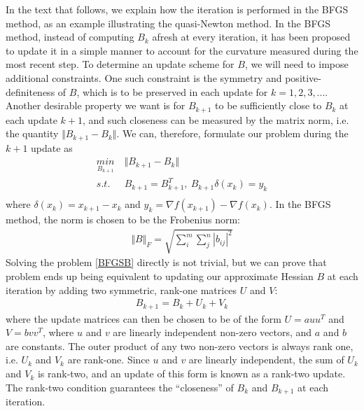 \documentclass  [
  paper    = a4,
  BCOR     = 10mm,
  twoside,
  fontsize = 12pt,
  fleqn,
  toc      = bibnumbered,
  toc      = listofnumbered,
  numbers  = noendperiod,
  headings = normal,
  listof   = leveldown,
  version  = 3.03
]                                       {scrreprt}
\newcommand{\<}{\langle}
\renewcommand{\>}{\rangle}
\begin{document}
   In the text that follows, we explain how the iteration is performed in the BFGS method, as an example illustrating the quasi-Newton method. In the BFGS method, instead of computing $B_k$ afresh at every iteration, it has been proposed to update it in a simple manner to account for the curvature measured during the most recent step. To determine an update scheme for $B$, we will need to impose additional constraints. One such constraint is the symmetry and positive-definiteness of $B$, which is to be preserved in each update for $k = 1,2, 3, ...$. Another desirable property we want is for $B_{k+1}$ to be sufficiently close to $B_k$ at each update $k+1$, and such closeness can be measured by the matrix norm, i.e. the quantity $\Vert B_{k+1} - B_{k} \Vert$. We can, therefore, formulate our problem during the $k+1$ update as 
   \begin{equation}
   \begin{aligned}
   \underset{B_{k+1}}{min} \  &  \Vert B_{k+1} - B_{k} \Vert\\
   s.t.\ \  & B_{k+1}= B_{k+1}^T, \ B_{k+1}\delta(x_k)  = y_k \\
   \end{aligned}
   \label{BFGSB}
   \end{equation}
   where $\delta(x_k) = x_{k+1} -x_k$ and $y_k = \nabla f(x_{k+1}) - \nabla f(x_k)$. In the BFGS method, the norm is chosen to be the Frobenius norm:
   \begin{align*}
   \Vert B \Vert_F = \sqrt{\sum_{i}^{m} \sum_{j}^{n} |b_{ij}|^2} 
   \end{align*}
   Solving the problem \ref{BFGSB} directly is not trivial, but we can prove that problem ends up being equivalent to updating our approximate Hessian $B$ at each iteration by adding two symmetric, rank-one matrices $U$ and $V$:
   \begin{align*}
   B_{k+1} = B_k + U_k + V_k
   \end{align*}
   where the update matrices can then be chosen to be of the form $U = a u u^T$ and $V = b v v^T$, where $u$ and $v$ are linearly independent non-zero vectors, and $a$ and $b$ are constants.  The outer product of any two non-zero vectors is always rank one, i.e. $U_k$ and $V_k$ are rank-one. Since $u$ and $v$ are linearly independent, the sum of $U_k$ and $V_k$ is rank-two, and an update of this form is known as a rank-two update. The rank-two condition guarantees the “closeness” of $B_k$ and $B_{k+1}$ at each iteration. 
   
\end{document}
